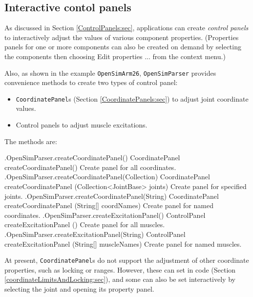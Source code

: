 \subsection{Interactive contol panels}
\label{OpenSimPanels:sec}

As discussed in Section \ref{ControlPanels:sec}, applications can create {\it
control panels} to interactively adjust the values of various component
properties. (Properties panels for one or more components can also be created
on demand by selecting the components then choosing {\sf Edit properties ...}
from the context menu.)

Also, as shown in the example {\tt OpenSimArm26}, {\tt OpenSimParser}
provides convenience methods to create two types of control panel:

\begin{itemize}

\item {\tt CoordinatePanel}s (Section \ref{CoordinatePanels:sec}) to
adjust joint coordinate values.

\item Control panels to adjust muscle excitations.

\end{itemize}

The methods are:
%
\begin{methodtable}{0.67}{0.33}
\midline
%
\methodentry
{\osim.OpenSimParser.createCoordinatePanel()}%
{CoordinatePanel createCoordinatePanel()}%
{Create panel for all coordinates.}%
%
\methodentry
{\osim.OpenSimParser.createCoordinatePanel(Collection)}%
{CoordinatePanel createCoordinatePanel (Collection<JointBase> joints)}%
{Create panel for specified joints.}%
%
\methodentry
{\osim.OpenSimParser.createCoordinatePanel(String)}%
{CoordinatePanel createCoordinatePanel (String[] coordNames)}%
{Create panel for named coordinates.}%
%
\methodspace{0.5em}%
\methodentry
{\osim.OpenSimParser.createExcitationPanel()}%
{ControlPanel createExcitationPanel ()}%
{Create panel for all muscles.}%
%
\methodentry
{\osim.OpenSimParser.createExcitationPanel(String)}%
{ControlPanel createExcitationPanel (String[] muscleNames)}%
{Create panel for named muscles.}%
%
\midline
\end{methodtable}
%
\begin{sideblock}
At present, {\tt CoordinatePanel}s do not support the adjustment of other
coordinate properties, such as locking or ranges. However, these can set in
code (Section \ref{coordinateLimitsAndLocking:sec}), and some
can also be set interactively by selecting the joint and
opening its property panel.
\end{sideblock}

